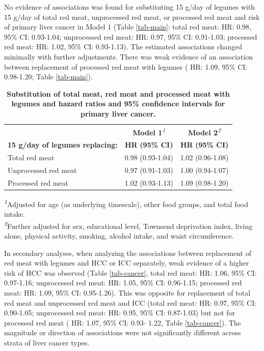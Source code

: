 \documentclass[nutrients,article,submit,moreauthors,pdftex]{Definitions/mdpi}
\begin{document}
No evidence of associations was found for substituting 15 g/day of
legumes with 15 g/day of total red meat, unprocessed red meat, or
processed red meat and risk of primary liver cancer in Model 1 (Table
\ref{tab-main}: total red meat: HR: 0.98, 95\% CI: 0.93-1.04;
unprocessed red meat: HR: 0.97, 95\% CI: 0.91-1.03; processed red meat:
HR: 1.02, 95\% CI: 0.93-1.13). The estimated associations changed
minimally with further adjustments. There was weak evidence of an
association between replacement of processed red meat with legumes ( HR:
1.09, 95\% CI: 0.98-1.20; Table \ref{tab-main}).

\begin{table}[t]
\caption{
{\small \textbf{Substitution of total meat, red meat and processed meat with legumes and hazard ratios and 95\% confidence intervals for primary liver cancer.}}
}\label{tabmain} 
\fontsize{9.0pt}{10.8pt}\selectfont
\begin{tabular*}{1\linewidth}{@{\extracolsep{\fill}}lcc}
\toprule
 & {\bfseries \textbf{Model 1}}\textsuperscript{\textit{1}} & {\bfseries \textbf{Model 2}}\textsuperscript{\textit{2}} \\ 
\cmidrule(lr){2-2} \cmidrule(lr){3-3}
\textbf{15 g/day of legumes replacing:} & \textbf{HR} \textbf{(95\% CI)} & \textbf{HR} \textbf{(95\% CI)} \\ 
\midrule\addlinespace[2.5pt]
Total red meat & 0.98 (0.93-1.04) & 1.02 (0.96-1.08) \\ 
Unprocessed red meat & 0.97 (0.91-1.03) & 1.00 (0.94-1.07) \\ 
Processed red meat & 1.02 (0.93-1.13) & 1.09 (0.98-1.20) \\ 
\bottomrule
\end{tabular*}
\begin{minipage}{\linewidth}
\textsuperscript{\textit{1}}Adjusted for age (as underlying timescale), other food groups, and total food intake.\\
\textsuperscript{\textit{2}}Further adjusted for sex, educational level, Townsend deprivation index, living alone, physical activity, smoking, alcohol intake, and waist circumference.\\
\end{minipage}
\end{table}

In secondary analyses, when analyzing the associations between
replacement of red meat with legumes and HCC or ICC separately, weak
evidence of a higher risk of HCC was observed (Table \ref{tab-cancer},
total red meat: HR: 1.06, 95\% CI: 0.97-1.16; unprocessed red meat: HR:
1.05, 95\% CI: 0.96-1.15; processed red meat: HR: 1.09, 95\% CI:
0.95-1.26). This was opposite for replacement of total red meat and
unprocessed red meat and ICC (total red meat: HR: 0.97, 95\% CI:
0.90-1.05; unprocessed red meat: HR: 0.95, 95\% CI: 0.87-1.03) but not
for processed red meat ( HR: 1.07, 95\% CI: 0.93- 1.22, Table
\ref{tab-cancer}). The magnitude or direction of associations were not
significantly different across strata of liver cancer types.
\end{document}
